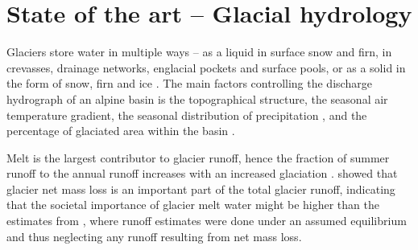 \documentclass[12pt, a4paper]{article}
\begin{document}
\section{State of the art -- Glacial hydrology}
Glaciers store water in multiple ways -- as a liquid in surface snow and firn,
in crevasses, drainage networks, englacial pockets and surface pools, or as a
solid in the form of snow, firn and ice
\parencite{janssonConceptGlacierStorage2003}. The main factors controlling the
discharge hydrograph of an alpine basin is the topographical structure, the
seasonal air temperature gradient, the seasonal distribution of precipitation
\parencite{zappaSeasonalWaterBalance2003}, and the percentage of glaciated area
within the basin \parencite{janssonConceptGlacierStorage2003}. 

Melt is the largest contributor to glacier runoff, hence the fraction of summer
runoff to the annual runoff increases with an increased glaciation
\parencite{zappaSeasonalWaterBalance2003,chenInfluenceAlpineGlaciers1990}.
\textcite{blissGlobalResponseGlacier2014} showed that glacier net
mass loss is an important part of the total glacier runoff, indicating that the
societal importance of glacier melt water might be higher than the estimates
from \textcite{kaserContributionPotentialGlaciers2010}, where runoff estimates
were done under an assumed equilibrium and thus neglecting any runoff resulting
from net mass loss.


\end{document}
